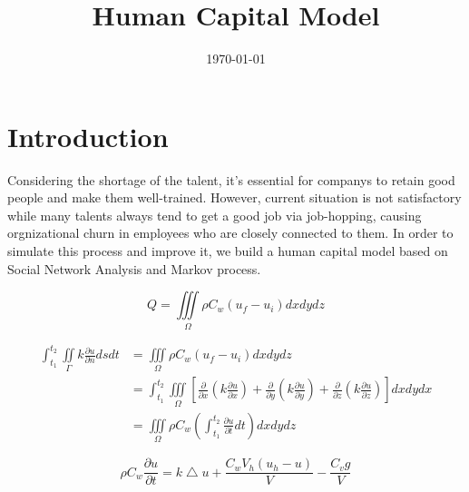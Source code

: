 \documentclass[12pt,a4paper,titlepage]{article}
\begin{document}
\title{Human Capital Model} \date{\today{}}
\maketitle

\tableofcontents

\newpage

\section{Introduction}
\label{sec:introduction}

Considering the shortage of the talent, it's essential for companys to
retain good people and make them well-trained. However, current
situation is not satisfactory while many talents always tend to get a
good job via job-hopping, causing orgnizational churn in employees who
are closely connected to them. In order to simulate this process and
improve it, we build a human capital model based on Social Network
Analysis and Markov process.

\begin{displaymath}
Q=\iiint\limits_{\Omega}\rho C_{w}(u_f - u_i)dx dy dz
\end{displaymath}

\begin{displaymath}
\begin{aligned}
\int_{t_1}^{t_2} \iint\limits_{\Gamma}k\frac{\partial u}{\partial n}dsdt & =\iiint\limits_{\Omega}\rho C_{w}(u_f - u_i)dx dy dz\\
& =\int_{t_1}^{t_2}\iiint\limits_{\Omega}[\frac{\partial}{\partial x}(k\frac{\partial u}{\partial x})+\frac{\partial}{\partial y}(k\frac{\partial u}{\partial y})+\frac{\partial}{\partial z}(k\frac{\partial u}{\partial z})]dxdydx\\
& = \iiint\limits_{\Omega}\rho C_{w}(\int_{t_1}^{t_2}\frac{\partial u}{\partial t}dt)dxdydz
\end{aligned}
\end{displaymath}

\begin{displaymath}
\rho C_{w}\frac{\partial u}{\partial t}=k\bigtriangleup u+\frac{C_w V_h(u_h-u)}{V}-\frac{C_v g}{V}
\end{displaymath}
\end{document}
